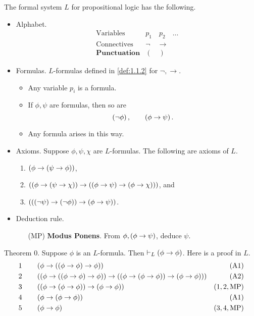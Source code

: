 \begin{definition}
The formal system $ L $ for propositional logic has the following.
\begin{itemize}
\item Alphabet.
$$
\begin{array}{ll}
\text{Variables} & p_1 \quad p_2 \quad \dots \\
\text{Connectives} & \neg \quad \rightarrow \\
\textbf{Punctuation} & ( \quad )
\end{array}
$$
\item Formulas. $ L $-formulas defined in \ref{def:1.1.2} for $ \neg, \rightarrow $.
\begin{itemize}
\item Any variable $ p_i $ is a formula.
\item If $ \phi, \psi $ are formulas, then so are
$$ \left( \neg \phi \right), \qquad \left( \phi \rightarrow \psi \right). $$
\item Any formula arises in this way.
\end{itemize}
\item Axioms. Suppose $ \phi, \psi, \chi $ are $ L $-formulas. The following are axioms of $ L $.
\begin{enumerate}[label=(A\arabic*)]
\item $ \left( \phi \rightarrow \left( \psi \rightarrow \phi \right) \right) $,
\item $ \left( \left( \phi \rightarrow \left( \psi \rightarrow \chi \right) \right) \rightarrow \left( \left( \phi \rightarrow \psi \right) \rightarrow \left( \phi \rightarrow \chi \right) \right) \right) $, and
\item $ \left( \left( \left( \neg \psi \right) \rightarrow \left( \neg \phi \right) \right) \rightarrow \left( \phi \rightarrow \psi \right) \right) $.
\end{enumerate}
\item Deduction rule.
\begin{itemize}
\item[(MP)] \textbf{Modus Ponens}. From $ \phi, \left( \phi \rightarrow \psi \right) $, deduce $ \psi $.
\end{itemize}
\end{itemize}
\end{definition}

\begin{example}
\label{eg:1.2.3}
Theorem $ 0 $. Suppose $ \phi $ is an $ L $-formula. Then $ \vdash_L \left( \phi \rightarrow \phi \right) $. Here is a proof in $ L $.
\begin{align*}
1 \qquad & \left( \phi \rightarrow \left( \left( \phi \rightarrow \phi \right) \rightarrow \phi \right) \right) & \left( \text{A1} \right) \\
2 \qquad & \left( \left( \phi \rightarrow \left( \left( \phi \rightarrow \phi \right) \rightarrow \phi \right) \right) \rightarrow \left( \left( \phi \rightarrow \left( \phi \rightarrow \phi \right) \right) \rightarrow \left( \phi \rightarrow \phi \right) \right) \right) & \left( \text{A2} \right) \\
3 \qquad & \left( \left( \phi \rightarrow \left( \phi \rightarrow \phi \right) \right) \rightarrow \left( \phi \rightarrow \phi \right) \right) & \left( 1, 2, \text{MP} \right) \\
4 \qquad & \left( \phi \rightarrow \left( \phi \rightarrow \phi \right) \right) & \left( \text{A1} \right) \\
5 \qquad & \left( \phi \rightarrow \phi \right) & \left( 3, 4, \text{MP} \right)
\end{align*}
\end{example}

